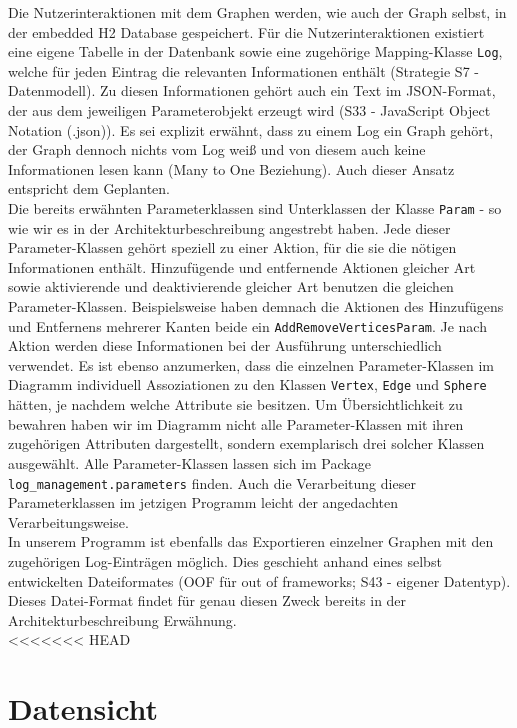 \documentclass[enabledeprecatedfontcommands,fontsize=11pt,paper=a4,twoside]{scrartcl}
\newcounter{one}
\begin{document}
Die Nutzerinteraktionen mit dem Graphen werden, wie auch der Graph selbst, in der embedded H2 Database gespeichert. Für die Nutzerinteraktionen existiert eine eigene Tabelle in der Datenbank sowie eine zugehörige Mapping-Klasse \texttt{Log}, welche für jeden Eintrag die relevanten Informationen enthält (Strategie S7 - Datenmodell). Zu diesen Informationen gehört auch ein Text im JSON-Format, der aus dem jeweiligen Parameterobjekt erzeugt wird (S33 - JavaScript Object Notation (.json)). Es sei explizit erwähnt, dass zu einem Log ein Graph gehört, der Graph dennoch nichts vom Log weiß und von diesem auch keine Informationen lesen kann (Many to One Beziehung). Auch dieser Ansatz entspricht dem Geplanten. \\
Die bereits erwähnten Parameterklassen sind Unterklassen der Klasse \texttt{Param} - so wie wir es in der Architekturbeschreibung angestrebt haben. Jede dieser Parameter-Klassen gehört speziell zu einer Aktion, für die sie die nötigen Informationen enthält. Hinzufügende und entfernende Aktionen gleicher Art sowie aktivierende und deaktivierende gleicher Art benutzen die gleichen Parameter-Klassen. Beispielsweise haben demnach die Aktionen des Hinzufügens und Entfernens mehrerer Kanten beide ein \texttt{AddRemoveVerticesParam}. Je nach Aktion werden diese Informationen bei der Ausführung unterschiedlich verwendet. Es ist ebenso anzumerken, dass die einzelnen Parameter-Klassen im Diagramm individuell Assoziationen zu den Klassen \texttt{Vertex}, \texttt{Edge} und \texttt{Sphere} hätten, je nachdem welche Attribute sie besitzen. Um Übersichtlichkeit zu bewahren haben wir im Diagramm nicht alle Parameter-Klassen mit ihren zugehörigen Attributen dargestellt, sondern exemplarisch drei solcher Klassen ausgewählt. Alle Parameter-Klassen lassen sich im Package \texttt{log\_management.parameters} finden. Auch die Verarbeitung dieser Parameterklassen im jetzigen Programm leicht der angedachten Verarbeitungsweise. \\

In unserem Programm ist ebenfalls das Exportieren einzelner Graphen mit den zugehörigen Log-Einträgen möglich. Dies geschieht anhand eines selbst entwickelten Dateiformates (OOF für \glqq out of frameworks\grqq; S43 - eigener Datentyp). Dieses Datei-Format findet für genau diesen Zweck bereits in der Architekturbeschreibung Erwähnung.\\

<<<<<<< HEAD
\newpage
\section{Datensicht}
\label{sec:datensicht}
\end{document}
